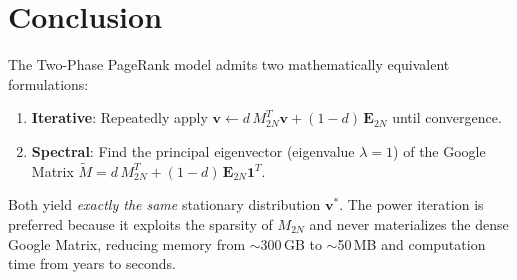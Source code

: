 \documentclass[11pt,a4paper]{article}
\theoremstyle{definition}
\begin{document}
\section{Conclusion}

The Two-Phase PageRank model admits two mathematically equivalent
formulations:

\begin{enumerate}
  \item \textbf{Iterative}: Repeatedly apply $\bm{v} \leftarrow
        d\,M_{2N}^T\bm{v} + (1-d)\,\bm{E}_{2N}$ until convergence.
  \item \textbf{Spectral}: Find the principal eigenvector (eigenvalue
        $\lambda = 1$) of the Google Matrix
        $\widetilde{M} = d\,M_{2N}^T + (1-d)\,\bm{E}_{2N}\bm{1}^T$.
\end{enumerate}

Both yield \emph{exactly the same} stationary distribution $\bm{v}^*$.
The power iteration is preferred because it exploits the sparsity of
$M_{2N}$ and never materializes the dense Google Matrix, reducing
memory from $\sim$300\,GB to $\sim$50\,MB and computation time from
years to seconds.
\end{document}
